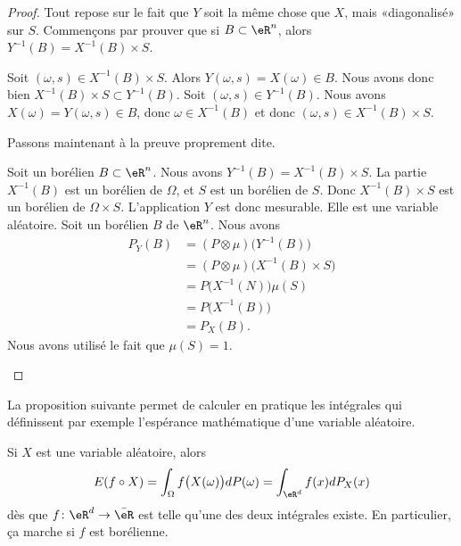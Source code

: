 \begin{proof}
    Tout repose sur le fait que \( Y\) soit la même chose que \( X\), mais «diagonalisé» sur \( S\). Commençons par prouver que si \( B\subset \eR^n\), alors \( Y^{-1}(B)=X^{-1}(B)\times S\).
    \begin{subproof}
        Soit \( (\omega,s)\in X^{-1}(B)\times S\). Alors \( Y(\omega,s)=X(\omega)\in B\). Nous avons donc bien \( X^{-1}(B)\times S\subset Y^{-1}(B)\).
        Soit \( (\omega,s)\in Y^{-1}(B)\). Nous avons \( X(\omega)= Y(\omega,s)\in B\), donc \( \omega\in X^{-1}(B)\) et donc \( (\omega,s)\in X^{-1}(B)\times S\).
    \end{subproof}
    Passons maintenant à la preuve proprement dite.
    \begin{subproof}
        Soit un borélien \( B\subset \eR^n\). Nous avons \( Y^{-1}(B)=X^{-1}(B)\times S\). La partie \( X^{-1}(B)\) est un borélien de \( \Omega\), et \( S\) est un borélien de \( S\). Donc \( X^{-1}(B)\times S\) est un borélien de \( \Omega\times S\). L'application \( Y\) est donc mesurable. Elle est une variable aléatoire.
        Soit un borélien \( B\) de \( \eR^n\). Nous avons
        \begin{subequations}
            \begin{align}
                P_Y(B)&=(P\otimes \mu)\big( Y^{-1}(B) \big)\\
                &=(P\otimes \mu)\big( X^{-1}(B)\times S \big)\\
                &=P\big( X^{-1}(N) \big)\mu(S)\\
                &=P\big( X^{-1}(B) \big)\\
                &=P_X(B).
            \end{align}
        \end{subequations}
        Nous avons utilisé le fait que \( \mu(S)=1\).
    \end{subproof}
\end{proof}

La proposition suivante permet de calculer en pratique les intégrales qui définissent par exemple l'espérance mathématique d'une variable aléatoire.
\begin{proposition}\label{PropintdPintdPXeR}
	Si \( X\) est une variable aléatoire, alors
	\begin{equation}
		E(f\circ X)=\int_{\Omega}f\big( X(\omega) \big)dP(\omega)=\int_{\eR^d}f(x)dP_X(x)
	\end{equation}
	dès que \( f\colon \eR^d\to \bar\eR\) est telle qu'une des deux intégrales existe. En particulier, ça marche si \( f\) est borélienne.
\end{proposition}


